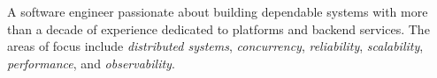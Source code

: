

\begin{cvparagraph}

	A software engineer passionate about building dependable systems with more than a decade of experience dedicated to platforms and backend services. The areas of focus include {\textit{distributed systems}}, {\textit{concurrency}}, {\textit{reliability}}, {\textit{scalability}}, {\textit{performance}}, and {\textit{observability}}.

\end{cvparagraph}
